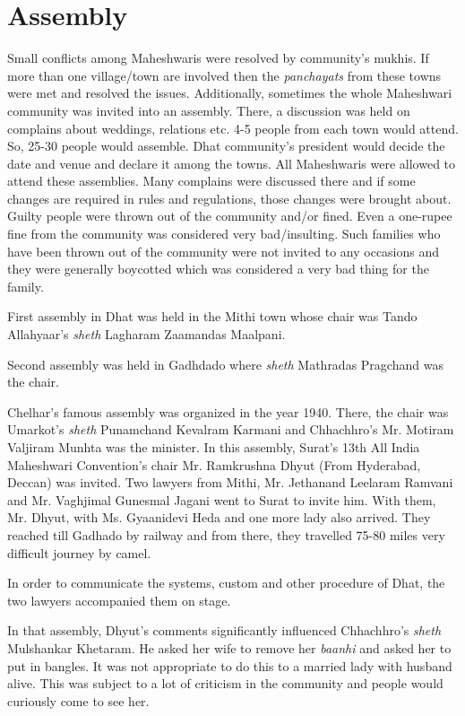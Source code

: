 \chapter{Assembly}
Small conflicts among Maheshwaris were resolved by community's mukhis. If more
than one village/town are involved then the \textit{panchayats} from these
towns were met and resolved the issues. Additionally, sometimes the whole
Maheshwari community was invited into an assembly. There, a discussion was held
on complains about weddings, relations etc. 4-5 people from each town would
attend. So, 25-30 people would assemble. Dhat community's president would
decide the date and venue and declare it among the towns. All Maheshwaris were
allowed to attend these assemblies. Many complains were discussed there and if
some changes are required in rules and regulations, those changes were brought
about. Guilty people were thrown out of the community and/or fined. Even a
one-rupee fine from the community was considered very bad/insulting. Such
families who have been thrown out of the community were not invited to any
occasions and they were generally boycotted which was considered a very bad
thing for the family. 

First assembly in Dhat was held in the Mithi town whose chair was Tando
Allahyaar's \textit{sheth} Lagharam Zaamandas Maalpani.

Second assembly was held in Gadhdado where \textit{sheth} Mathradas Pragchand
was the chair.

Chelhar's famous assembly was organized in the year 1940. There, the chair was
Umarkot's \textit{sheth} Punamchand Kevalram Karmani and Chhachhro's Mr.
Motiram Valjiram Munhta was the minister. In this assembly, Surat's 13th All
India Maheshwari Convention's chair Mr. Ramkrushna Dhyut (From Hyderabad,
Deccan) was invited. Two lawyers from Mithi, Mr. Jethanand Leelaram Ramvani and
Mr. Vaghjimal Gunesmal Jagani went to Surat to invite him. With them, Mr.
Dhyut, with Ms. Gyaanidevi Heda and one more lady also arrived. They reached
till Gadhado by railway and from there, they travelled 75-80 miles very
difficult journey by camel.

In order to communicate the systems, custom and other procedure of Dhat, the
two lawyers accompanied them on stage.

In that assembly, Dhyut's comments significantly influenced Chhachhro's
\textit{sheth} Mulshankar Khetaram. He asked her wife to remove her
\textit{baanhi} and asked her to put in bangles. It was not appropriate to do
this to a married lady with husband alive. This was subject to a lot of
criticism in the community and people would curiously come to see her.

